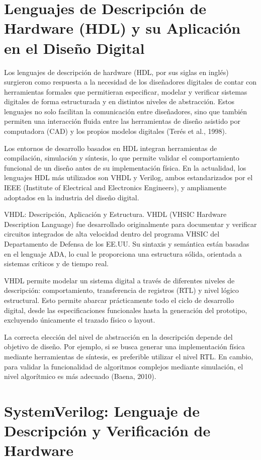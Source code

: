 \section{Lenguajes de Descripción de Hardware (HDL) y su Aplicación en el Diseño Digital}

Los lenguajes de descripción de hardware (HDL, por sus siglas en inglés) surgieron como respuesta a la necesidad de los diseñadores digitales de contar con herramientas formales que permitieran especificar, modelar y verificar sistemas digitales de forma estructurada y en distintos niveles de abstracción. Estos lenguajes no solo facilitan la comunicación entre diseñadores, sino que también permiten una interacción fluida entre las herramientas de diseño asistido por computadora (CAD) y los propios modelos digitales (Terés et al., 1998).

Los entornos de desarrollo basados en HDL integran herramientas de compilación, simulación y síntesis, lo que permite validar el comportamiento funcional de un diseño antes de su implementación física. En la actualidad, los lenguajes HDL más utilizados son VHDL y Verilog, ambos estandarizados por el IEEE (Institute of Electrical and Electronics Engineers), y ampliamente adoptados en la industria del diseño digital.

VHDL: Descripción, Aplicación y Estructura.
VHDL (VHSIC Hardware Description Language) fue desarrollado originalmente para documentar y verificar circuitos integrados de alta velocidad dentro del programa VHSIC del Departamento de Defensa de los EE.UU. Su sintaxis y semántica están basadas en el lenguaje ADA, lo cual le proporciona una estructura sólida, orientada a sistemas críticos y de tiempo real.

VHDL permite modelar un sistema digital a través de diferentes niveles de descripción: comportamiento, transferencia de registros (RTL) y nivel lógico estructural. Esto permite abarcar prácticamente todo el ciclo de desarrollo digital, desde las especificaciones funcionales hasta la generación del prototipo, excluyendo únicamente el trazado físico o layout.

La correcta elección del nivel de abstracción en la descripción depende del objetivo de diseño. Por ejemplo, si se busca generar una implementación física mediante herramientas de síntesis, es preferible utilizar el nivel RTL. En cambio, para validar la funcionalidad de algoritmos complejos mediante simulación, el nivel algorítmico es más adecuado (Baena, 2010).


\section{SystemVerilog: Lenguaje de Descripción y Verificación de Hardware }

